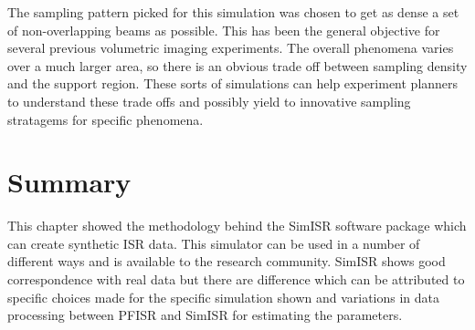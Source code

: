 The sampling pattern picked for this simulation was chosen to get as dense a set of non-overlapping beams as possible.  This has been the general objective for several previous volumetric imaging experiments.
The overall phenomena varies over a much larger area, so there is an obvious trade off between sampling density and the support region. These sorts of simulations can help experiment planners to understand these trade offs and possibly yield to innovative sampling stratagems for specific phenomena. 

\section{Summary}
This chapter showed the methodology behind the SimISR software package which can create synthetic ISR data. This simulator can be used in a number of different ways and is available to the research community. SimISR shows good correspondence with real data but there are difference which can be attributed to specific choices made for the specific simulation shown and variations in data processing between PFISR and SimISR for estimating the parameters.